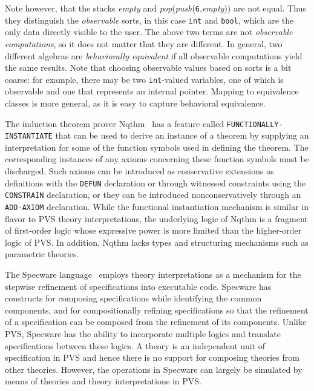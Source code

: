 \documentclass[11pt,twoside,openright,titlepage]{cslreport}
\newcommand{\specware}{{\sc Specware}}
\begin{document}
Note however, that the stacks \emph{empty} and
\emph{pop}(\emph{push}(\texttt{6},\emph{empty})) are not equal.  Thus they
distinguish the \emph{observable} sorts, in this case \texttt{int} and
\texttt{bool}, which are the only data directly visible to the user.  The
above two terms are not \emph{observable computations}, so it does not
matter that they are different.  In general, two different algebras are
\emph{behaviorally equivalent} if all observable computations yield the
same results. Note that choosing observable values based on sorts is a bit
coarse: for example, there may be two \texttt{int}-valued variables, one of
which is observable and one that represents an internal pointer.  Mapping
to equivalence classes is more general, as it is easy to capture
behavioral equivalence.

The induction theorem prover Nqthm~\cite{boyer-moore88,BoyerGoldschlag91}
has a feature called \texttt{FUNCTIONALLY-INSTANTIATE} that can be used to
derive an instance of a theorem by supplying an interpretation for some of
the function symbols used in defining the theorem.  The corresponding
instances of any axioms concerning these function symbols must be
discharged.  Such axioms can be introduced as conservative extensions as
definitions with the \texttt{DEFUN} declaration or through witnessed
constraints using the \texttt{CONSTRAIN} declaration, or they can be
introduced nonconservatively through an \texttt{ADD-AXIOM}
declaration.  While the functional instantiation mechanism is similar in
flavor to PVS theory interpretations, the underlying logic of Nqthm is a
fragment of first-order logic whose expressive power is more limited
than the higher-order logic of PVS.  In addition, Nqthm lacks types and
structuring mechanisms such as parametric theories.

The \specware{} language~\cite{SrinivasJullig95} employs theory
interpretations as a mechanism for the stepwise refinement of
specifications into executable code.  \specware{} has constructs for
composing specifications while identifying the common components, and for
compositionally refining specifications so that the refinement of a
specification can be composed from the refinement of its components.
Unlike PVS, \specware{} has the ability to incorporate multiple logics
and translate specifications between these logics.  A theory is an
independent unit of specification in PVS and hence there is no support for
composing theories from other theories.  However, the operations in
\specware{} can largely be simulated by means of theories and theory
interpretations in PVS.
\end{document}
